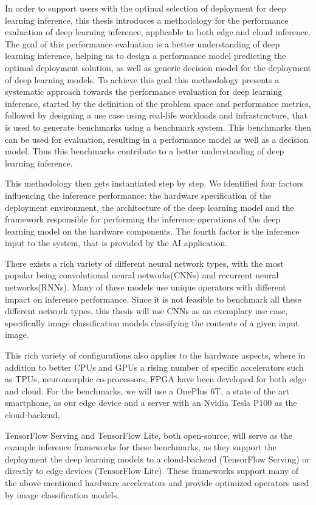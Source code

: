 In order to support users with the optimal selection of deployment for deep learning inference, this thesis introduces a methodology for the performance evaluation of deep learning inference, applicable to both edge and cloud inference.
The goal of this performance evaluation is a better understanding of deep learning inference, helping us to design a performance model predicting the optimal deployment solution, as well as generic decision model for the deployment of deep learning models.
To achieve this goal this methodology presents a systematic approach towards the performance evaluation for deep learning inference, started by the definition of the problem space and performance metrics, followed by designing a use case using real-life workloads and infrastructure, that is used to generate benchmarks using a benchmark system.
This benchmarks then can be used for evaluation, resulting in a performance model as well as a decision model. Thus this benchmarks contribute to a better understanding of deep learning inference.

This methodology then gets instantiated step by step.
We identified four factors influencing the inference performance: the hardware specification of the deployment environment, the architecture of the deep learning model and the framework responsible for performing the inference operations of the deep learning model on the hardware components. The fourth factor is the inference input to the system, that is provided by the AI application.

There exists a rich variety of different neural network types, with the most popular being convolutional neural networks(CNNs) and recurrent neural networks(RNNs).
Many of these models use unique operators with different impact on inference performance.
Since it is not feasible to benchmark all these different network types, this thesis will use CNNs as an exemplary use case, specifically image classification models classifying the contents of a given input image.

This rich variety of configurations also applies to the hardware aspects, where in addition to better CPUs and GPUs a rising number of specific accelerators such as TPUs, neuromorphic co-processors, FPGA have been developed for both edge and cloud.
For the benchmarks, we will use a OnePlus 6T, a state of the art smartphone, as our edge device and a server with an Nvidia Tesla P100 as the cloud-backend.

TensorFlow Serving and TensorFlow Lite, both open-source, will serve as the example inference frameworks for these benchmarks, as they support the deployment the deep learning models to a cloud-backend (TensorFlow Serving) or directly to edge devices (TensorFlow Lite). These frameworks support many of the above mentioned hardware accelerators and provide optimized operators used by image classification models.

